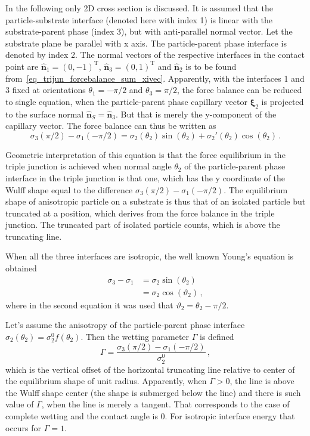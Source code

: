 In the following only 2D cross section is discussed. It is assumed that the particle-substrate interface (denoted here with index 1) is linear with the substrate-parent phase (index 3), but with anti-parallel normal vector. Let the substrate plane be parallel with x axis. The particle-parent phase interface is denoted by index 2. The normal vectors of the respective interfaces in the contact point are $\hat{\bm{n}}_1=(0,-1)^{\mathrm{T}}$, $\hat{\bm{n}}_3=(0,1)^{\mathrm{T}}$ and $\hat{\bm{n}}_2$ is to be found from~\eqref{eq_trijun_forcebalance_sum_xivec}. Apparently, with the interfaces 1 and 3 fixed at orientations $\theta_1=-\pi/2$ and $\theta_3=\pi/2$, the force balance can be reduced to single equation, when the particle-parent phase capillary vector $\bm{\xi}_2$ is projected to the surface normal $\hat{\bm{n}}_S=\hat{\bm{n}}_3$. But that is merely the y-component of the capillary vector. The force balance can thus be written as
\begin{equation}\label{eq_youngs_eq_aniso}
    \sigma_{3}(\pi/2)-\sigma_1(-\pi/2)  
      = \sigma_2(\theta_2)\sin(\theta_2) + \sigma_2'(\theta_2)\cos(\theta_2) \,.
\end{equation}

Geometric interpretation of this equation is that the force equilibrium in the triple junction is achieved when normal angle $\theta_2$ of the particle-parent phase interface in the triple junction is that one, which has the y coordinate of the Wulff shape equal to the difference $\sigma_{3}(\pi/2)-\sigma_1(-\pi/2) $. The equilibrium shape of anisotropic particle on a substrate is thus that of an isolated particle but truncated at a position, which derives from the force balance in the triple junction. The truncated part of isolated particle counts, which is above the truncating line.

When all the three interfaces are isotropic, the well known Young's equation is obtained
\begin{align}
    \sigma_3-\sigma_1 &= \sigma_2\sin(\theta_2) \\
        &= \sigma_2\cos(\vartheta_2)
    \,,
\end{align}
where in the second equation it was used that $\vartheta_2=\theta_2-\pi/2$.

Let's assume the anisotropy of the particle-parent phase interface $\sigma_2(\theta_2)=\sigma_2^0f(\theta_2)$. Then the wetting parameter $\Gamma$ is defined
\begin{equation}
    \Gamma = \frac{\sigma_{3}(\pi/2)-\sigma_1(-\pi/2) }{\sigma_2^0} \,,
\end{equation}
which is the vertical offset of the horizontal truncating line relative to center of the equilibrium shape of unit radius. Apparently, when $\Gamma > 0$, the line is above the Wulff shape center (the shape is submerged below the line) and there is such value of $\Gamma$, when the line is merely a tangent. That corresponds to the case of complete wetting and the contact angle is 0. For isotropic interface energy that occurs for $\Gamma=1$.

